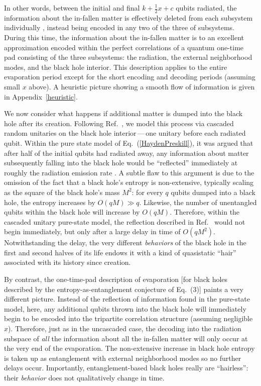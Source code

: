 \documentclass[twocolumn,aps,prl,amsmath,amssymb,floatfix]{revtex4}
\begin{document}
In other words, between the initial and final $k+\frac{1}{2}x+c$ qubits
radiated, the information about the in-fallen matter is effectively
deleted from each subsystem individually \cite{me,Kretschmann}, instead
being encoded in any two of the three of subsystems. During this time,
the information about the in-fallen matter is to an excellent
approximation encoded within the perfect correlations of a quantum
one-time pad \cite{me,Leung02} consisting of the three subsystems:
the radiation, the external neighborhood modes, and the black hole
interior. This description applies to the entire evaporation period
except for the short encoding and decoding periods (assuming small 
$x$ above). A heuristic picture showing a smooth flow of information 
is given in Appendix~\ref{heuristic}.

We now consider what happens if additional matter is dumped into the 
black hole after its creation. Following Ref.~, 
we model this process via cascaded random unitaries on the black hole 
interior\,---\,one unitary before each radiated qubit. Within the pure 
state model of Eq.~(\ref{HaydenPreskill}), it was argued \cite{Hayden07} 
that after half of the initial qubits had radiated away, any information 
about matter subsequently falling into the black hole would be ``reflected'' 
immediately at roughly the radiation emission rate \cite{Hayden07}. A
subtle flaw to this argument is due to the omission of the fact that a
black hole's entropy is non-extensive, typically scaling as the square
of the black hole's mass $M^2$: for every $q$ qubits dumped into
a black hole, the entropy increases by $O(qM)\gg q$. Likewise, the
number of unentangled qubits within the black hole will increase by
$O(qM)$. Therefore, within the cascaded unitary pure-state model,
the reflection described in Ref.~ would not begin
immediately, but only after a large delay in time of $O(qM^2)$.
%
Notwithstanding the delay, the very different {\it behaviors\/} of
the black hole in the first and second halves of its life endows
it with a kind of quasistatic ``hair'' associated with its history
since creation.

By contrast, the one-time-pad description of evaporation [for black 
holes described by the entropy-as-entanglement conjecture of Eq.~(3)] 
paints a very different picture. Instead of the reflection of information 
found in the pure-state model, here, any additional qubits thrown into 
the black hole will immediately begin to be encoded into the tripartite 
correlation structure (assuming negligible $x$). Therefore, just as in 
the uncascaded case, the decoding into the radiation subspace of {\it 
all} the information about all the in-fallen matter will only occur at 
the very end of the evaporation. The non-extensive increase in black 
hole entropy is taken up as entanglement with external neighborhood 
modes so no further delays occur. 
%
Importantly, entanglement-based black holes really are ``hairless'': 
their {\it behavior\/} does not qualitatively change in time.
\end{document}
